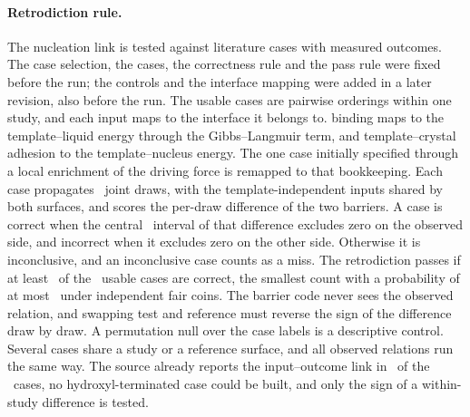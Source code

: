 \paragraph*{Retrodiction rule.}
The nucleation link is tested against literature cases with measured outcomes. %
The case selection, the cases, the correctness rule and the pass rule were fixed before the run; the controls and the interface mapping were added in a later revision, also before the run. %
The usable cases are pairwise orderings within one study, and each input maps to the interface it belongs to. %
 binding maps to the template--liquid energy through the Gibbs--Langmuir term, and template--crystal adhesion to the template--nucleus energy. %
The one case initially specified through a local enrichment of the driving force is remapped to that bookkeeping. %
Each case propagates \NumRetroDraws\ joint draws, with the template-independent inputs shared by both surfaces, and scores the per-draw difference of the two barriers. %
A case is correct when the central \NumRetroIntervalLevel\ interval of that difference excludes zero on the observed side, and incorrect when it excludes zero on the other side. %
Otherwise it is inconclusive, and an inconclusive case counts as a miss. %
The retrodiction passes if at least \NumRetroPassCount\ of the \NumRetroUsableCases\ usable cases are correct, the smallest count with a probability of at most \NumRetroChanceBound\ under independent fair coins. %
The barrier code never sees the observed relation, and swapping test and reference must reverse the sign of the difference draw by draw. %
A permutation null over the case labels is a descriptive control. %
Several cases share a study or a reference surface, and all observed relations run the same way. %
The source already reports the input--outcome link in \NumRetroLinkReported\ of the \NumRetroUsableCases\ cases, no hydroxyl-terminated case could be built, and only the sign of a within-study difference is tested. %

